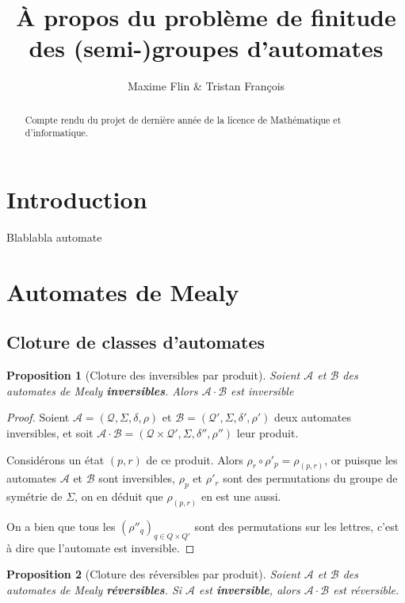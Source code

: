 \documentclass{article}
\title{À propos du problème de finitude des (semi-)groupes d'automates}
\author{Maxime Flin \& Tristan François}
\newtheorem{prop}{Proposition}
\begin{document}
\maketitle

\begin{abstract}
  Compte rendu du projet de dernière année de la licence de Mathématique et d'informatique.
\end{abstract}


\section*{Introduction}
Blablabla automate

\section{Automates de Mealy}

\subsection{Cloture de classes d'automates}
\begin{prop}[Cloture des inversibles par produit]
  Soient $\mathcal{A}$ et $\mathcal{B}$ des automates de Mealy \textbf{inversibles}. Alors $\mathcal{A}\cdot\mathcal{B}$ est inversible
\end{prop}

\begin{proof}
  Soient $\mathcal{A}=\left(\mathcal{Q}, \Sigma, \delta, \rho\right)$ et $\mathcal{B}=\left(\mathcal{Q'}, \Sigma, \delta', \rho'\right)$ deux automates inversibles, et soit $\mathcal{A\cdot B}=\left(\mathcal{Q\times Q'}, \Sigma, \delta'', \rho''\right)$ leur produit.


  Considérons un état $(p, r)$ de ce produit. Alors $\rho_r\circ\rho'_p=\rho_{(p,r)}$, or puisque les automates $\mathcal{A}$ et $\mathcal{B}$ sont inversibles, $\rho_p$ et $\rho'_r$ sont des permutations du groupe de symétrie de $\Sigma$, on en déduit que $\rho_{(p, r)}$ en est une aussi.


  On a bien que tous les ${(\rho''_q)}_{q\in Q\times Q'}$ sont des permutations sur les lettres, c'est à dire que l'automate est inversible.
\end{proof}

\begin{prop}[Cloture des réversibles par produit]
  Soient $\mathcal{A}$ et $\mathcal{B}$ des automates de Mealy \textbf{réversibles}. Si $\mathcal{A}$ est \textbf{inversible}, alors $\mathcal{A}\cdot\mathcal{B}$ est réversible.
\end{prop}
\end{document}
